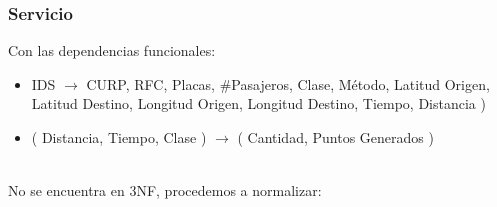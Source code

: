 \documentclass{article}
\begin{document}
      \subsubsection{Servicio}

      \noindent Con las dependencias funcionales:
       \begin{itemize}
       \item IDS $\rightarrow$ CURP, RFC, Placas, $\#$Pasajeros, Clase, Método,
         Latitud Origen, Latitud Destino, Longitud Origen, Longitud Destino, Tiempo, Distancia )
       \item ( Distancia, Tiempo, Clase ) $\rightarrow$ ( Cantidad, Puntos Generados )
       \end{itemize}\\
       
       \noindent No se encuentra en 3NF, procedemos a normalizar:
\end{document}
